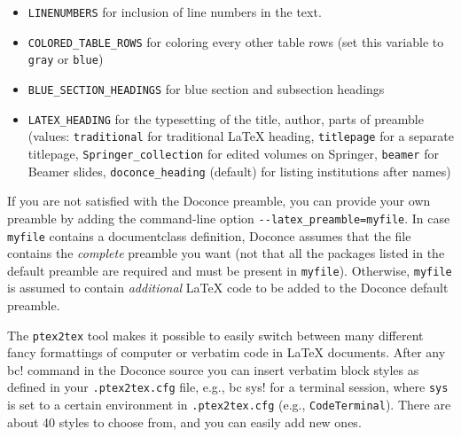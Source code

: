 \documentclass[%
oneside,                 %
final,                   %
10pt]{article}
\begin{document}
\begin{itemize}
 \item {\fontsize{10pt}{10pt}\Verb!LINENUMBERS!} for inclusion of line numbers in the text.

 \item {\fontsize{10pt}{10pt}\Verb!COLORED_TABLE_ROWS!} for coloring every other table rows (set this
   variable to {\fontsize{10pt}{10pt}\Verb!gray!} or {\fontsize{10pt}{10pt}\Verb!blue!})

 \item {\fontsize{10pt}{10pt}\Verb!BLUE_SECTION_HEADINGS!} for blue section and subsection headings

 \item {\fontsize{10pt}{10pt}\Verb!LATEX_HEADING!} for the typesetting of the title, author, parts of
   preamble (values: {\fontsize{10pt}{10pt}\Verb!traditional!} for traditional {\LaTeX} heading,
   {\fontsize{10pt}{10pt}\Verb!titlepage!} for a separate titlepage, {\fontsize{10pt}{10pt}\Verb!Springer_collection!} for
   edited volumes on Springer, {\fontsize{10pt}{10pt}\Verb!beamer!} for Beamer slides, {\fontsize{10pt}{10pt}\Verb!doconce_heading!}
   (default) for listing institutions after names)
\end{itemize}

\noindent
If you are not satisfied with the Doconce preamble, you can provide
your own preamble by adding the command-line option {\fontsize{10pt}{10pt}\Verb!--latex_preamble=myfile!}.
In case {\fontsize{10pt}{10pt}\Verb!myfile!} contains a documentclass definition, Doconce assumes
that the file contains the \emph{complete} preamble you want (not that all
the packages listed in the default preamble are required and must be
present in {\fontsize{10pt}{10pt}\Verb!myfile!}). Otherwise, {\fontsize{10pt}{10pt}\Verb!myfile!} is assumed to contain
\emph{additional} {\LaTeX} code to be added to the Doconce default preamble.

The {\fontsize{10pt}{10pt}\Verb!ptex2tex!} tool makes it possible to easily switch between many
different fancy formattings of computer or verbatim code in {\LaTeX}
documents. After any {\fontsize{10pt}{10pt}\Verb!!bc!} command in the Doconce source you can
insert verbatim block styles as defined in your {\fontsize{10pt}{10pt}\Verb!.ptex2tex.cfg!}
file, e.g., {\fontsize{10pt}{10pt}\Verb!!bc sys!} for a terminal session, where {\fontsize{10pt}{10pt}\Verb!sys!} is set to
a certain environment in {\fontsize{10pt}{10pt}\Verb!.ptex2tex.cfg!} (e.g., {\fontsize{10pt}{10pt}\Verb!CodeTerminal!}).
There are about 40 styles to choose from, and you can easily add
new ones.
\end{document}
